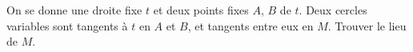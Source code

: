 On se donne une droite fixe $t$ et deux points fixes $A$, $B$ de $t$. Deux cercles variables sont tangents à $t$ en $A$ et $B$, et tangents entre eux en $M$. Trouver le lieu de $M$.
